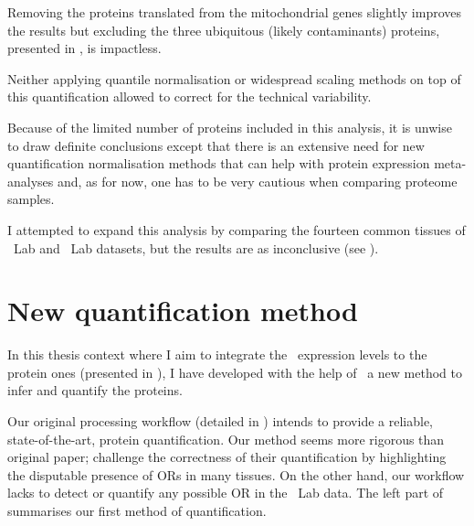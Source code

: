 Removing the proteins translated from the mitochondrial genes slightly
improves the results
but excluding the three ubiquitous (likely contaminants) proteins, presented
in ,
is impactless.\mybr\

Neither applying quantile normalisation or widespread scaling methods
on top of this quantification allowed to correct for the technical variability.

Because of the limited number of proteins included in this analysis,
it is unwise to draw definite conclusions
except that there is an extensive need for new quantification normalisation methods
that can help with protein expression meta-analyses
and, as for now, one has to be very cautious when comparing proteome samples.\mybr\

I attempted to expand this analysis by comparing the fourteen common tissues
of \pandey\ Lab and \kuster\ Lab datasets,
but the results are as inconclusive
(see ).\mybr\

\section{New quantification method}\label{sec:NewQuantProt}
\vspace{-3mm}
In this thesis context where I aim to integrate
the \mRNA\ expression levels to the protein ones
(presented in ),
I have developed with the help of \james\
a new method to infer and quantify the proteins.\mybr\

Our original processing workflow (detailed in )
intends to provide a reliable, state-of-the-art, protein quantification.
Our method seems more rigorous than \citet{PandeyData} original paper;
\citet{Ezkurdia2014-qx} challenge the correctness of their quantification
by highlighting the disputable presence of \glspl{OR} in many tissues.
On the other hand, our workflow lacks to detect or quantify any possible \gls{OR}
in the \pandey\ Lab data.
The left part of  summarises
our first method of quantification.\mybr\

